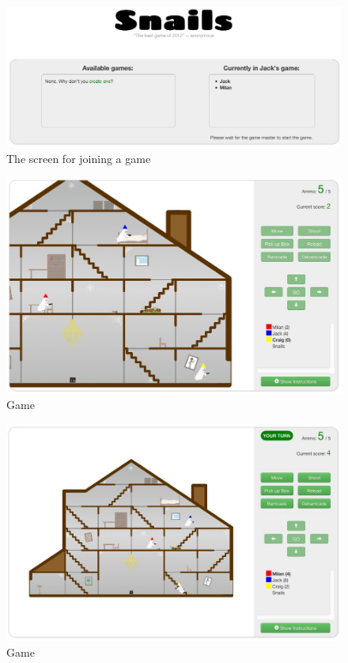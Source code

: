 \documentclass{article}
\begin{document}
\begin{figure}[htb]
\centering
\includegraphics[width=1.0\textwidth]{join.jpg}
\caption{The screen for joining a game}
\end{figure}

\begin{figure}[htb]
\centering
\includegraphics[width=1.0\textwidth]{game-1.jpg}
\caption{Game}
\end{figure}

\begin{figure}[htb]
\centering
\includegraphics[width=1.0\textwidth]{game-2.jpg}
\caption{Game}
\end{figure}
\end{document}
